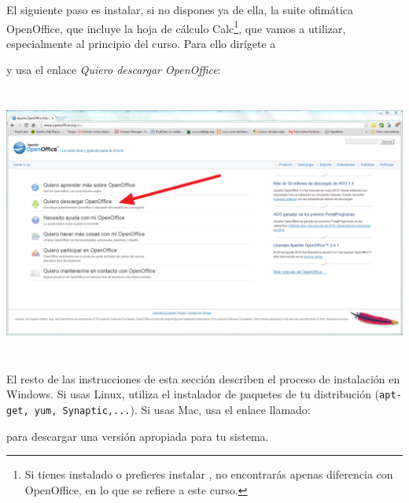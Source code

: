 \documentclass[10pt,a4paper]{article}\usepackage[]{graphicx}\usepackage[]{color}
\newcounter {cont01}
\begin{document}
El siguiente paso es instalar, si no dispones ya de ella, la suite ofimática OpenOffice, que
incluye la hoja de cálculo Calc\footnote{Si tienes instalado o prefieres instalar
, no encontrarás apenas diferencia con OpenOffice, en
lo que se refiere a este curso.}, que vamos a utilizar, especialmente al principio del curso. Para
ello dirígete a
\begin{center}
\end{center}
y usa el enlace {\em Quiero descargar  OpenOffice}:
    \begin{center}
    \includegraphics[height=9cm]{../fig/Tut00-WebOpenOffice.png}
    \end{center}
El resto de las instrucciones de esta sección describen el proceso de instalación en Windows. Si
usas Linux, utiliza el instalador de paquetes de tu distribución ({\tt apt-get, yum,
Synaptic,...}). Si usas Mac, usa el enlace llamado:
\begin{center}
\end{center}
para descargar una versión apropiada para tu sistema.
\end{document}
